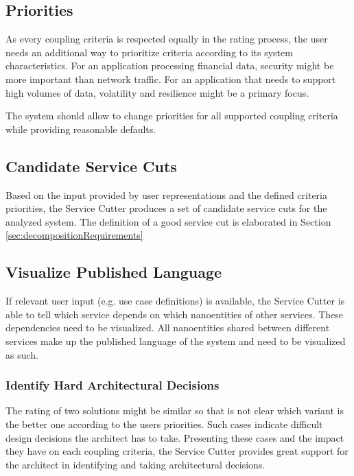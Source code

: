 \subsection{Priorities}

As every coupling criteria is respected equally in the rating process, the user needs an additional way to prioritize criteria according to its system characteristics. For an application processing financial data, security might be more important than network traffic. For an application that needs to support high volumes of data, volatility and resilience might be a primary focus.

The system should allow to change priorities for all supported coupling criteria while providing reasonable defaults. 

\subsection{Candidate Service Cuts}

Based on the input provided by user representations and the defined criteria priorities, the Service Cutter produces a set of candidate service cuts for the analyzed system. The definition of a good service cut is elaborated in Section \ref{sec:decompositionRequirements}

\subsection{Visualize Published Language}

If relevant user input (e.g. use case definitions) is available, the Service Cutter is able to tell which service depends on which nanoentities of other services. These dependencies need to be visualized. All nanoentities shared between different services make up the published language of the system and need to be visualized as such.

\subsubsection{Identify Hard Architectural Decisions}
\label{subsec:identifyHardADs}

The rating of two solutions might be similar so that is not clear which variant is the better one according to the users priorities. Such cases indicate difficult design decisions the architect has to take. Presenting these cases and the impact they have on each coupling criteria, the Service Cutter provides great support for the architect in identifying and taking architectural decisions.

